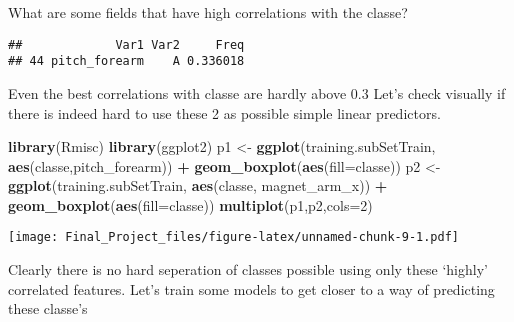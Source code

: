 \documentclass[]{article}
\newenvironment{Shaded}{\begin{snugshade}}{\end{snugshade}}
\newcommand{\DataTypeTok}[1]{\textcolor[rgb]{0.13,0.29,0.53}{#1}}
\newcommand{\DecValTok}[1]{\textcolor[rgb]{0.00,0.00,0.81}{#1}}
\newcommand{\FloatTok}[1]{\textcolor[rgb]{0.00,0.00,0.81}{#1}}
\newcommand{\KeywordTok}[1]{\textcolor[rgb]{0.13,0.29,0.53}{\textbf{#1}}}
\newcommand{\NormalTok}[1]{#1}
\newcommand{\OperatorTok}[1]{\textcolor[rgb]{0.81,0.36,0.00}{\textbf{#1}}}
\newcommand{\StringTok}[1]{\textcolor[rgb]{0.31,0.60,0.02}{#1}}
\begin{document}
What are some fields that have high correlations with the classe?

\begin{Shaded}
\end{Shaded}

\begin{verbatim}
##             Var1 Var2     Freq
## 44 pitch_forearm    A 0.336018
\end{verbatim}

Even the best correlations with classe are hardly above 0.3 Let's check
visually if there is indeed hard to use these 2 as possible simple
linear predictors.

\begin{Shaded}
\begin{Highlighting}[]
\KeywordTok{library}\NormalTok{(Rmisc)}
\KeywordTok{library}\NormalTok{(ggplot2)}
\NormalTok{p1 <-}\StringTok{ }\KeywordTok{ggplot}\NormalTok{(training.subSetTrain, }\KeywordTok{aes}\NormalTok{(classe,pitch_forearm)) }\OperatorTok{+}\StringTok{ }
\StringTok{  }\KeywordTok{geom_boxplot}\NormalTok{(}\KeywordTok{aes}\NormalTok{(}\DataTypeTok{fill=}\NormalTok{classe))}
\NormalTok{p2 <-}\StringTok{ }\KeywordTok{ggplot}\NormalTok{(training.subSetTrain, }\KeywordTok{aes}\NormalTok{(classe, magnet_arm_x)) }\OperatorTok{+}\StringTok{ }
\StringTok{  }\KeywordTok{geom_boxplot}\NormalTok{(}\KeywordTok{aes}\NormalTok{(}\DataTypeTok{fill=}\NormalTok{classe))}
\KeywordTok{multiplot}\NormalTok{(p1,p2,}\DataTypeTok{cols=}\DecValTok{2}\NormalTok{)}
\end{Highlighting}
\end{Shaded}

\texttt{[image: Final\_Project\_files/figure-latex/unnamed-chunk-9-1.pdf]}

Clearly there is no hard seperation of classes possible using only these
`highly' correlated features. Let's train some models to get closer to a
way of predicting these classe's
\end{document}

